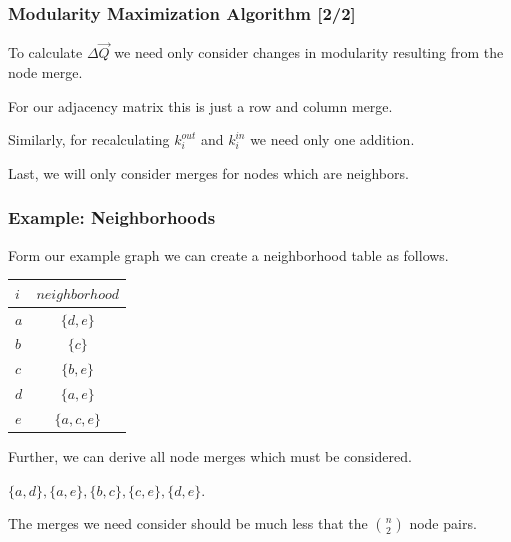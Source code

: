 \documentclass{beamer}
\newcommand{\ds}{\displaystyle}
\begin{document}
\begin{frame}

    \frametitle{Modularity Maximization Algorithm [2/2]}

    To calculate $ \Delta \vec{Q} $ we need only consider changes in modularity resulting from the node merge.\pause

    \vspace{2.5mm}
    For our adjacency matrix this is just a row and column merge.\pause

    \vspace{2.5mm}
    Similarly, for recalculating $ k_{i}^{out} $ and $ k_{i}^{in} $ we need only one addition.\pause

    \vspace{2.5mm}
    Last, we will only consider merges for nodes which are neighbors.

\end{frame}

\begin{frame}

    \frametitle{Example: Neighborhoods}

    Form our example graph we can create a neighborhood table as follows.\pause

    \vspace{2.5mm}
    \begin{center}
        \begin{tabular}{l | c}
            $ i           $ & $ neighborhood $ \\
            \hline
            $ a $ & $ \{d, e\}    $ \\
            $ b $ & $ \{c\}       $ \\
            $ c $ & $ \{b, e\}    $ \\
            $ d $ & $ \{a, e\}    $ \\
            $ e $ & $ \{a, c, e\} $ \\
        \end{tabular}
    \end{center}\pause

    \vspace{2.5mm}
    Further, we can derive all node merges which must be considered.\pause

    \vspace{2.5mm}
    \begin{center}
        $ \{a, d\}, \{a, e\}, \{b, c\}, \{c, e\}, \{d, e\} $.
    \end{center}\pause

    \vspace{2.5mm}
    The merges we need consider should be much less that the $ \ds \binom{n}{2} $ node pairs.

\end{frame}
\end{document}
